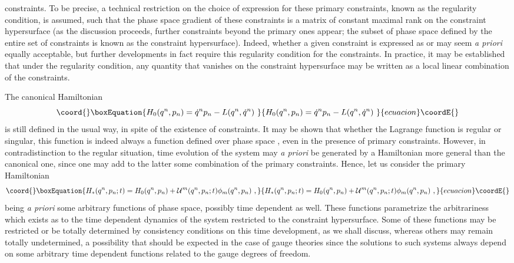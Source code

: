 \documentclass[a4paper,11pt]{article}
\begin{document}
constraints. To be precise, a technical restriction on the choice of
expression for these primary constraints, known as the regularity condition,
is assumed, such that the phase space gradient of these constraints is a 
matrix of constant maximal rank on the constraint hypersurface (as the 
discussion proceeds, further constraints beyond the primary ones appear; 
the subset of phase space defined by the entire set of constraints is known 
as the constraint hypersurface). Indeed, whether a given constraint 
\coordHE{} is expressed as \coordHE{} or \coordHE{} may 
seem {\sl a priori\/} equally acceptable, but further developments in fact 
require this re\-gu\-la\-ri\-ty condition for the constraints. In practice, 
it may be established that under the regularity condition, any quantity that
vanishes on the constraint hypersurface may be written as a local
linear combination of the constraints.

The canonical Hamiltonian
\begin{equation}\coord{}\boxEquation{
H_0(q^n,p_n)=\dot{q}^np_n-L(q^n,\dot{q}^n)\ 
}{
H_0(q^n,p_n)=\dot{q}^np_n-L(q^n,\dot{q}^n)\ 
}{ecuacion}\coordE{}\end{equation}
is still defined in the usual way, in spite of the existence of constraints.
It may be shown that whether the Lagrange function is regular
or singular, this function \myHighlight{$H_0(q^n,p_n)$}\coordHE{} is indeed always a function
defined over phase space \myHighlight{$(q^n,p_n)$}\coordHE{}, even in the presence of primary 
constraints. However, in contradistinction to the regular situation,
time evolution of the system may {\sl a priori\/} be generated by a 
Hamiltonian more general than the canonical one, since one may add to the
latter some combination of the primary constraints. Hence, let us
consider the primary Hamiltonian
\begin{equation}\coord{}\boxEquation{
H_*(q^n,p_n;t)=H_0(q^n,p_n)+{\cal U}^m(q^n,p_n;t)\phi_m(q^n,p_n)\ ,
}{
H_*(q^n,p_n;t)=H_0(q^n,p_n)+{\cal U}^m(q^n,p_n;t)\phi_m(q^n,p_n)\ ,
}{ecuacion}\coordE{}\end{equation}
\myHighlight{${\cal U}^m(q^n,p_n;t)$}\coordHE{} being {\sl a priori\/} some arbitrary functions
of phase space, possibly time dependent as well. These functions parametrize
the arbitrariness which exists as to the time dependent dynamics of the
system restricted to the constraint hypersurface. Some of these functions
may be restricted or be totally determined by consistency conditions on this
time development, as we shall discuss, whereas others may remain totally
undetermined, a possibility that should be expected in the case of
gauge theories since the solutions to such systems always depend on
some arbitrary time dependent functions related to the gauge degrees
of freedom.
\end{document}
